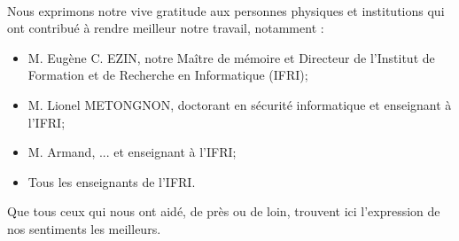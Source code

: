 \remerciements


\paragraph{}
      Nous exprimons notre vive gratitude aux personnes physiques et institutions qui ont contribué à rendre meilleur notre travail,
   notamment :
  \begin{itemize}
   \item M. Eugène C. EZIN,  notre Maître de mémoire et Directeur de l'Institut de Formation et de Recherche en Informatique (IFRI);
   \item M. Lionel METONGNON, doctorant en sécurité informatique et enseignant à l'IFRI;   \item M. Armand, ... et enseignant à l'IFRI;
   \item Tous les enseignants de l'IFRI. 
  \end{itemize}
    Que tous ceux qui nous ont aidé, de près ou de loin, trouvent ici l'expression de nos sentiments les meilleurs.

